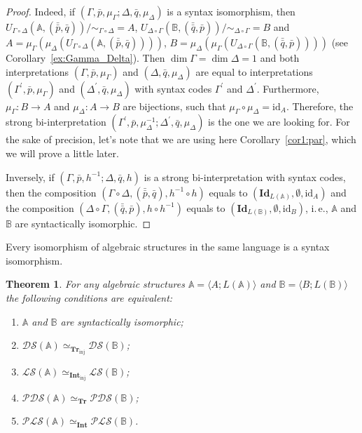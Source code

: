 \documentclass[12pt]{article}
\newtheorem{theorem}{Theorem}
\theoremstyle{definition}
\def\MA{{\mathbb{A}}}
\def\MB{{\mathbb{B}}}
\def\Int{{\mathbf{Int}}}
\def\Tr{{\mathbf{Tr}}}
\newcommand{\Inj}{\mathrm{inj}}
\def\PLS{{\mathcal{PLS}}}
\def\PDS{{\mathcal{PDS}}}
\def\DS{{\mathcal{DS}}}
\def\LS{{\mathcal{LS}}}
\def\id{{\mathrm{id}}}
\def\Id{{\mathbf{Id}}}
\begin{document}
\begin{proof}
Indeed, if $(\Gamma,\bar p,\mu_\Gamma;\Delta,\bar q,\mu_\Delta)$ is a syntax isomorphism, then $U_{\Gamma\circ\Delta}(\MA,(\bar{\bar p},\bar q))/{\sim_{\Gamma\circ\Delta}}=A$, $U_{\Delta\circ\Gamma}(\MB,(\bar{\bar q},\bar p))/{\sim_{\Delta\circ\Gamma}}=B$ and $A=\mu_\Gamma(\mu_\Delta(U_{\Gamma\circ\Delta}(\MA,(\bar{\bar p},\bar q))))$, $B=\mu_\Delta(\mu_\Gamma(U_{\Delta\circ\Gamma}(\MB,(\bar{\bar q},\bar p))))$  (see Corollary~\ref{ex:Gamma_Delta}). Then $\dim\Gamma=\dim\Delta=1$ and  both interpretations $(\Gamma,\bar p,\mu_\Gamma)$ and $(\Delta,\bar q,\mu_\Delta)$ are equal to interpretations $(\Gamma^\prime,\bar p,\mu_\Gamma)$ and $(\Delta^\prime,\bar q,\mu_\Delta)$ with syntax codes $\Gamma^\prime$ and $\Delta^\prime$. Furthermore, $\mu_\Gamma\colon B\to A$ and $\mu_\Delta\colon A\to B$ are bijections, such that $\mu_\Gamma\circ\mu_\Delta=\id_A$. Therefore, the strong bi-interpretation $(\Gamma^\prime,\bar p,\mu_\Delta^{-1};\Delta^\prime, \bar q,\mu_\Delta)$ is the one we are looking for. For the sake of precision, let's note that we are using here Corollary~\ref{cor1:par}, which we will prove a little later.
    
Inversely, if $(\Gamma,\bar p,h^{-1};\Delta,\bar q,h)$ is a strong bi-interpretation with syntax codes, then the composition $(\Gamma\circ\Delta,(\bar{\bar p},\bar q),h^{-1}\circ h)$ equals to $(\Id_{L(\MA)},\emptyset,\id_A)$ and the composition $(\Delta\circ\Gamma,(\bar{\bar q},\bar p),h\circ h^{-1})$ equals to $(\Id_{L(\MB)},\emptyset,\id_B)$, i.\,e., $\MA$ and $\MB$ are syntactically isomorphic.
\end{proof}

Every isomorphism of algebraic structures in the same language is a syntax isomorphism. 

\begin{theorem}\label{th:syn_iso}
For any algebraic structures $\MA=\langle A; L(\MA)\rangle$ and $\MB=\langle B; L(\MB)\rangle$ the following conditions are equivalent:
\begin{enumerate}[label=(\arabic*)]
    \item\label{syn1} $\MA$ and $\MB$ are syntactically isomorphic;
    \item\label{syn2} $\DS(\MA)\simeq_{\Tr_\Inj}\DS(\MB)$;
    \item\label{syn3}$\LS(\MA)\simeq_{\Int_\Inj}\LS(\MB)$;
    \item\label{syn4} $\PDS(\MA)\simeq_{\Tr}\PDS(\MB)$;
    \item\label{syn5} $\PLS(\MA)\simeq_{\Int}\PLS(\MB)$.
\end{enumerate}
\end{theorem}
\end{document}
